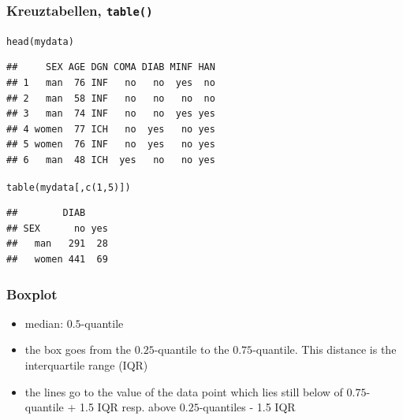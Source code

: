 \documentclass[extsize,handout,10pt]{beamer}\usepackage[]{graphicx}\usepackage[]{color}
\makeatletter
\newcommand{\hlnum}[1]{\textcolor[rgb]{0.502,0.086,1}{#1}}%
\newcommand{\hlstd}[1]{\textcolor[rgb]{0.251,0.251,0.251}{#1}}%
\newcommand{\hlkwd}[1]{\textcolor[rgb]{0.69,0.188,0.941}{#1}}%
\newenvironment{kframe}{%
 \def\at@end@of@kframe{}%
 \ifinner\ifhmode%
  \def\at@end@of@kframe{\end{minipage}}%
  \begin{minipage}{\columnwidth}%
 \fi\fi%
 \def\FrameCommand##1{\hskip\@totalleftmargin \hskip-\fboxsep
 \colorbox{shadecolor}{##1}\hskip-\fboxsep
     \hskip-\linewidth \hskip-\@totalleftmargin \hskip\columnwidth}%
 \MakeFramed {\advance\hsize-\width
   \@totalleftmargin\z@ \linewidth\hsize
   \@setminipage}}%
 {\par\unskip\endMakeFramed%
 \at@end@of@kframe}
\newenvironment{knitrout}{}{} %
\makeatother
\begin{document}
\begin{frame}[containsverbatim]
  \frametitle{Kreuztabellen, \texttt{table()}}  

\small

\begin{knitrout}\tiny
{}\color{fgcolor}\begin{kframe}
\begin{alltt}
\hlkwd{head}\hlstd{(mydata)}
\end{alltt}
\begin{verbatim}
##     SEX AGE DGN COMA DIAB MINF HAN
## 1   man  76 INF   no   no  yes  no
## 2   man  58 INF   no   no   no  no
## 3   man  74 INF   no   no  yes yes
## 4 women  77 ICH   no  yes   no yes
## 5 women  76 INF   no  yes   no yes
## 6   man  48 ICH  yes   no   no yes
\end{verbatim}
\begin{alltt}
\hlkwd{table}\hlstd{(mydata[,}\hlkwd{c}\hlstd{(}\hlnum{1}\hlstd{,}\hlnum{5}\hlstd{)])}
\end{alltt}
\begin{verbatim}
##        DIAB
## SEX      no yes
##   man   291  28
##   women 441  69
\end{verbatim}
\end{kframe}
\end{knitrout}
\end{frame}




\begin{frame}
  \frametitle{Boxplot}
  \begin{itemize}
  \item<1-> median: \alert{$0.5$-quantile}
  \item<2-> the box goes from the \alert{$0.25$-quantile} to the
    \alert{$0.75$-quantile}. This distance is the interquartile range
    (IQR)
  \item<3->the lines go to the value of the data point which lies
    still below of \alert{$0.75$-quantile + 1.5 IQR} resp. above
    \alert{$0.25$-quantiles - 1.5 IQR}
  \end{itemize}
\end{frame}
\end{document}
